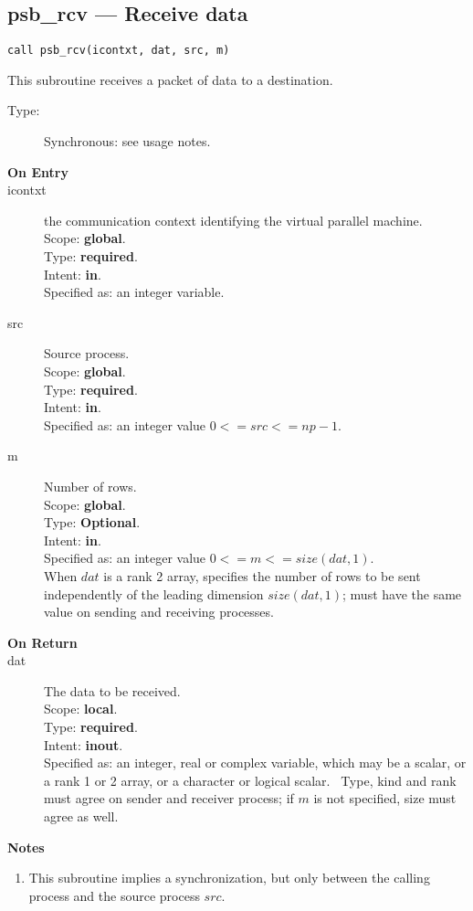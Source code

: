 \clearpage\subsection*{psb\_rcv --- Receive data}

\begin{verbatim}
call psb_rcv(icontxt, dat, src, m)
\end{verbatim}

This subroutine receives a packet of data to a destination.
\begin{description}
\item[Type:] Synchronous: see usage notes.
\item[\bf  On Entry ]
\item[icontxt] the communication context identifying the virtual
  parallel machine.\\
Scope: {\bf global}.\\
Type: {\bf required}.\\
Intent: {\bf in}.\\
Specified as: an integer variable.
\item[src] Source process.\\
Scope: {\bf global}.\\
Type: {\bf required}.\\
Intent: {\bf in}.\\
Specified as: an integer value $0<= src <= np-1$. \\
\item[m] Number of rows.\\
Scope: {\bf global}.\\
Type: {\bf Optional}.\\
Intent: {\bf in}.\\
Specified as: an integer value $0<= m <= size(dat,1)$. \\
When $dat$ is a rank 2 array, specifies the number of rows to be sent
independently of the leading dimension $size(dat,1)$; must have the
same value on sending and receiving processes.
\end{description}


\begin{description}
\item[\bf On Return]
\item[dat] The data to be received.\\
Scope: {\bf local}.\\
Type: {\bf required}.\\
Intent: {\bf inout}.\\
Specified as: an integer, real or complex variable, which may be a
scalar, or a rank 1 or 2 array, or a character or logical scalar. \
Type, kind and  rank must agree on sender and receiver process; if $m$ is
not specified, size must agree as well. 
\end{description}

{\par\noindent\large\bfseries Notes}
\begin{enumerate}
\item This subroutine implies a synchronization, but only between the
  calling process and the source  process $src$.
\end{enumerate}
